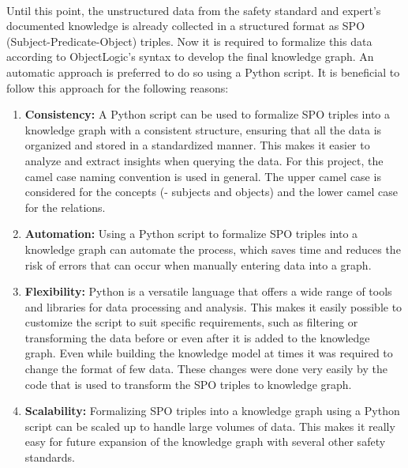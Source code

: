 \paragraph{} Until this point, the unstructured data from the safety standard and expert's documented knowledge is already collected in a structured format as SPO (Subject-Predicate-Object) triples. Now it is required to formalize this data according to ObjectLogic's syntax to develop the final knowledge graph. An automatic approach is preferred to do so using a Python script. It is beneficial to follow this approach for the following reasons:
\begin{enumerate}
    \item \textbf{Consistency: }A Python script can be used to formalize SPO triples into a knowledge graph with a consistent structure, ensuring that all the data is organized and stored in a standardized manner. This makes it easier to analyze and extract insights when querying the data. For this project, the camel case naming convention is used in general. The upper camel case is considered for the concepts (- subjects and objects) and the lower camel case for the relations.
    \item \textbf{Automation: }Using a Python script to formalize SPO triples into a knowledge graph can automate the process, which saves time and reduces the risk of errors that can occur when manually entering data into a graph.
    \item \textbf{Flexibility: }Python is a versatile language that offers a wide range of tools and libraries for data processing and analysis. This makes it easily possible to customize the script to suit specific requirements, such as filtering or transforming the data before or even after it is added to the knowledge graph. Even while building the knowledge model at times it was required to change the format of few data. These changes were done very easily by the code that is used to transform the SPO triples to knowledge graph.
    \item \textbf{Scalability: }Formalizing SPO triples into a knowledge graph using a Python script can be scaled up to handle large volumes of data. This makes it really easy for future expansion of the knowledge graph with several other safety standards.
\end{enumerate}

